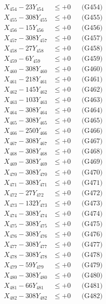 \documentclass[a4paper,10pt]{article}
\begin{document}
{\begin{align}
X_{454} - 23Y_{454} &\leq +0 && \text{(G454)} \\
X_{455} - 308Y_{455} &\leq +0 && \text{(G455)} \\
X_{456} - 15Y_{456} &\leq +0 && \text{(G456)} \\
X_{457} - 308Y_{457} &\leq +0 && \text{(G457)} \\
X_{458} - 27Y_{458} &\leq +0 && \text{(G458)} \\
X_{459} - 6Y_{459} &\leq +0 && \text{(G459)} \\
X_{460} - 308Y_{460} &\leq +0 && \text{(G460)} \\
\allowbreak
X_{461} - 218Y_{461} &\leq +0 && \text{(G461)} \\
X_{462} - 145Y_{462} &\leq +0 && \text{(G462)} \\
X_{463} - 103Y_{463} &\leq +0 && \text{(G463)} \\
X_{464} - 308Y_{464} &\leq +0 && \text{(G464)} \\
X_{465} - 308Y_{465} &\leq +0 && \text{(G465)} \\
X_{466} - 250Y_{466} &\leq +0 && \text{(G466)} \\
X_{467} - 308Y_{467} &\leq +0 && \text{(G467)} \\
X_{468} - 308Y_{468} &\leq +0 && \text{(G468)} \\
X_{469} - 308Y_{469} &\leq +0 && \text{(G469)} \\
X_{470} - 308Y_{470} &\leq +0 && \text{(G470)} \\
\allowbreak
X_{471} - 308Y_{471} &\leq +0 && \text{(G471)} \\
X_{472} - 27Y_{472} &\leq +0 && \text{(G472)} \\
X_{473} - 132Y_{473} &\leq +0 && \text{(G473)} \\
X_{474} - 308Y_{474} &\leq +0 && \text{(G474)} \\
X_{475} - 308Y_{475} &\leq +0 && \text{(G475)} \\
X_{476} - 308Y_{476} &\leq +0 && \text{(G476)} \\
X_{477} - 308Y_{477} &\leq +0 && \text{(G477)} \\
X_{478} - 308Y_{478} &\leq +0 && \text{(G478)} \\
X_{479} - 59Y_{479} &\leq +0 && \text{(G479)} \\
X_{480} - 308Y_{480} &\leq +0 && \text{(G480)} \\
\allowbreak
X_{481} - 66Y_{481} &\leq +0 && \text{(G481)} \\
X_{482} - 308Y_{482} &\leq +0 && \text{(G482)} \\

\end{align}}
\end{document}
